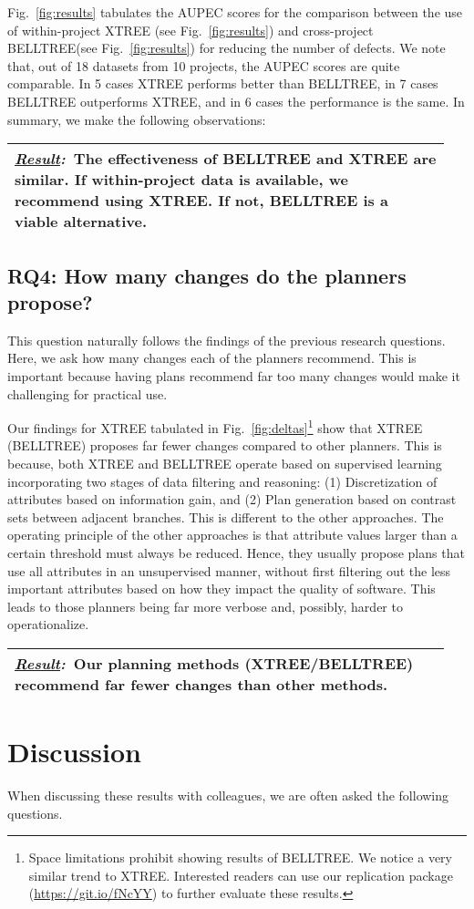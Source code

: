 \documentclass[10pt, journal, compsoc]{IEEEtran}
\newcommand{\result}[1]{
\vspace{0.2cm}
\noindent\begin{minipage}{\linewidth}
\begin{tabular}{|p{0.95\linewidth}|}
\hline\vspace{-0.2cm}
\textbf{\textit{\underline{Result}:}}~#1\\\hline
\end{tabular}
\end{minipage}\bigstrut
}
\newcommand{\fig}[1]{Fig.~\ref{fig:#1}}
\begin{document}
\fig{results} tabulates the AUPEC scores for the comparison between the use of within-project XTREE (see \fig{results}\protect{}) and cross-project BELLTREE(see \fig{results}\protect{}) for reducing the number of defects. We note that, out of 18 datasets from 10 projects, the AUPEC scores are quite comparable. In 5 cases XTREE performs better than BELLTREE, in 7 cases BELLTREE outperforms XTREE, and in 6 cases the performance is the same. In summary, we make the following observations:

\result{The effectiveness of BELLTREE and XTREE are similar. If within-project data is available, we recommend using XTREE. If not, BELLTREE is a viable alternative.}

\subsection*{RQ4: How many changes do the planners propose?}

This question naturally follows the findings of the previous research questions. Here, we ask how many changes each of the planners recommend. This is important because having plans recommend far too many changes would make it challenging for practical use. 

Our findings for XTREE tabulated in \fig{deltas}\footnote{Space limitations prohibit showing results of BELLTREE. We notice a very similar trend to XTREE. Interested readers can use our replication package (\url{https://git.io/fNcYY}) to further evaluate these results.} show that XTREE (BELLTREE) proposes far fewer changes compared to other planners. This is because, both XTREE and BELLTREE operate based on supervised learning incorporating two stages of data filtering and reasoning: (1) Discretization of attributes based on information gain, and (2) Plan generation based on contrast sets between adjacent branches. This is different to the other approaches. The operating principle of the other approaches is that attribute values larger than a certain threshold must always be reduced. Hence, they usually propose plans that use all attributes in an unsupervised manner, without first filtering out the less important attributes based on how they impact the quality of software. This leads to those planners being far more verbose and, possibly, harder to operationalize.


\result{Our planning methods (XTREE/BELLTREE) recommend far fewer changes than other methods.}


\section{Discussion}
\label{sect:discuss}
When discussing these results with colleagues, we are often asked the following questions.
\end{document}
